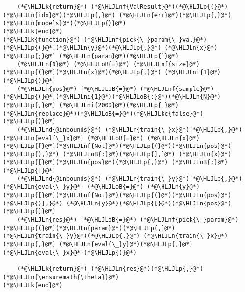 \documentclass[12pt,a4paper]{article}
\newcommand{\HLJLk}[1]{\textcolor[RGB]{148,91,176}{\textbf{#1}}}
\newcommand{\HLJLkc}[1]{\textcolor[RGB]{59,151,46}{\textit{#1}}}
\newcommand{\HLJLn}[1]{#1}
\newcommand{\HLJLnd}[1]{\textcolor[RGB]{214,102,97}{#1}}
\newcommand{\HLJLnf}[1]{\textcolor[RGB]{66,102,213}{#1}}
\newcommand{\HLJLni}[1]{\textcolor[RGB]{59,151,46}{#1}}
\newcommand{\HLJLoB}[1]{\textcolor[RGB]{102,102,102}{\textbf{#1}}}
\newcommand{\HLJLp}[1]{#1}
\begin{document}
\begin{lstlisting}
    (*@\HLJLk{return}@*) (*@\HLJLnf{ValResult}@*)(*@\HLJLp{(}@*)(*@\HLJLn{idx}@*)(*@\HLJLp{,}@*) (*@\HLJLn{err}@*)(*@\HLJLp{,}@*) (*@\HLJLn{models}@*)(*@\HLJLp{)}@*)
(*@\HLJLk{end}@*)
(*@\HLJLk{function}@*) (*@\HLJLnf{pick{\_}param{\_}val}@*)(*@\HLJLp{(}@*)(*@\HLJLn{y}@*)(*@\HLJLp{,}@*) (*@\HLJLn{x}@*)(*@\HLJLp{;}@*) (*@\HLJLn{param}@*)(*@\HLJLp{)}@*)
    (*@\HLJLn{N}@*) (*@\HLJLoB{=}@*) (*@\HLJLnf{size}@*)(*@\HLJLp{(}@*)(*@\HLJLn{x}@*)(*@\HLJLp{,}@*) (*@\HLJLni{1}@*)(*@\HLJLp{)}@*)
    (*@\HLJLn{pos}@*) (*@\HLJLoB{=}@*) (*@\HLJLnf{sample}@*)(*@\HLJLp{(}@*)(*@\HLJLni{1}@*)(*@\HLJLoB{:}@*)(*@\HLJLn{N}@*)(*@\HLJLp{,}@*) (*@\HLJLni{2000}@*)(*@\HLJLp{,}@*) (*@\HLJLn{replace}@*)(*@\HLJLoB{=}@*)(*@\HLJLkc{false}@*)(*@\HLJLp{)}@*)
    (*@\HLJLnd{@inbounds}@*) (*@\HLJLn{train{\_}x}@*)(*@\HLJLp{,}@*) (*@\HLJLn{eval{\_}x}@*) (*@\HLJLoB{=}@*) (*@\HLJLn{x}@*)(*@\HLJLp{[}@*)(*@\HLJLnf{Not}@*)(*@\HLJLp{(}@*)(*@\HLJLn{pos}@*)(*@\HLJLp{),}@*) (*@\HLJLoB{:}@*)(*@\HLJLp{],}@*) (*@\HLJLn{x}@*)(*@\HLJLp{[}@*)(*@\HLJLn{pos}@*)(*@\HLJLp{,}@*) (*@\HLJLoB{:}@*)(*@\HLJLp{]}@*)
    (*@\HLJLnd{@inbounds}@*) (*@\HLJLn{train{\_}y}@*)(*@\HLJLp{,}@*) (*@\HLJLn{eval{\_}y}@*) (*@\HLJLoB{=}@*) (*@\HLJLn{y}@*)(*@\HLJLp{[}@*)(*@\HLJLnf{Not}@*)(*@\HLJLp{(}@*)(*@\HLJLn{pos}@*)(*@\HLJLp{)],}@*) (*@\HLJLn{y}@*)(*@\HLJLp{[}@*)(*@\HLJLn{pos}@*)(*@\HLJLp{]}@*)
    (*@\HLJLn{res}@*) (*@\HLJLoB{=}@*) (*@\HLJLnf{pick{\_}param}@*)(*@\HLJLp{(}@*)(*@\HLJLn{param}@*)(*@\HLJLp{,}@*) (*@\HLJLn{train{\_}y}@*)(*@\HLJLp{,}@*) (*@\HLJLn{train{\_}x}@*)(*@\HLJLp{,}@*) (*@\HLJLn{eval{\_}y}@*)(*@\HLJLp{,}@*) (*@\HLJLn{eval{\_}x}@*)(*@\HLJLp{)}@*)

    (*@\HLJLk{return}@*) (*@\HLJLn{res}@*)(*@\HLJLp{,}@*) (*@\HLJLn{\ensuremath{\theta}}@*)
(*@\HLJLk{end}@*)



\end{lstlisting}
\end{document}
